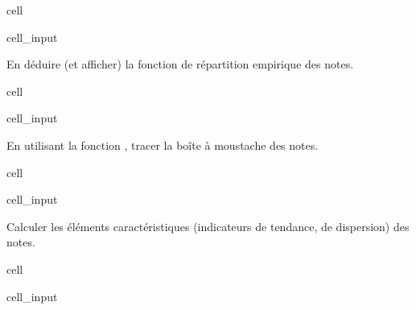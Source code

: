 \documentclass[letterpaper,10pt,french]{sphinxmanual}
\begin{document}
\begin{sphinxuseclass}{cell}
\begin{sphinxuseclass}{cell_input}
\begin{sphinxVerbatim}[commandchars=\\\{\}]
\end{sphinxVerbatim}

\end{sphinxuseclass}
\end{sphinxuseclass}
\sphinxAtStartPar
En déduire (et afficher) la fonction de répartition empirique des notes.

\begin{sphinxuseclass}{cell}
\begin{sphinxuseclass}{cell_input}
\begin{sphinxVerbatim}[commandchars=\\\{\}]
\end{sphinxVerbatim}

\end{sphinxuseclass}
\end{sphinxuseclass}
\sphinxAtStartPar
En utilisant la fonction , tracer la boîte à moustache des notes.

\begin{sphinxuseclass}{cell}
\begin{sphinxuseclass}{cell_input}
\begin{sphinxVerbatim}[commandchars=\\\{\}]
\end{sphinxVerbatim}

\end{sphinxuseclass}
\end{sphinxuseclass}
\sphinxAtStartPar
Calculer les éléments caractéristiques (indicateurs de tendance, de dispersion) des notes.

\begin{sphinxuseclass}{cell}
\begin{sphinxuseclass}{cell_input}
\begin{sphinxVerbatim}[commandchars=\\\{\}]
\end{sphinxVerbatim}

\end{sphinxuseclass}
\end{sphinxuseclass}
\end{document}
